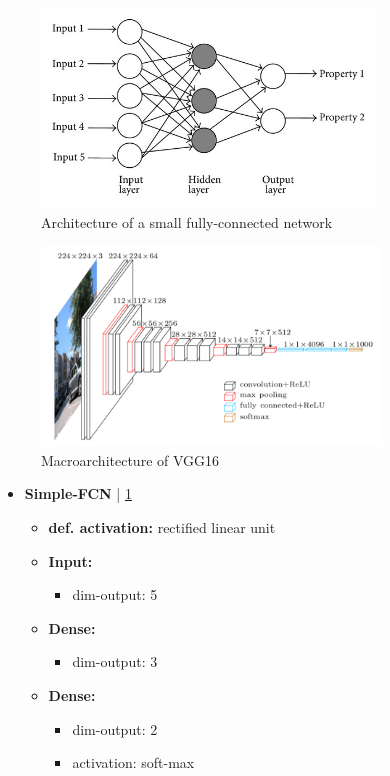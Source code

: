 \begin{figure}
	\centering
	\includegraphics[height=200px]{gfx/Dense_FFNetwork.jpg}
	\caption{Architecture of a small fully-connected network\\
		\cite{dense_network}}
	\label{fig:FFNetwork}
\end{figure}

\begin{figure}
	\centering
	\includegraphics[height=200px]{gfx/vgg16.png}
	\caption{Macroarchitecture of VGG16\\
		\cite{VGG16}}
	\label{fig:VGG16}
\end{figure}

\begin{itemize}
	\item[] \textbf{Simple-FCN} | \ref{fig:FFNetwork}
	\begin{itemize}
			\item[]\textbf{def. activation:} rectified linear unit
			\item[]\textbf{Input:} 
				\begin{itemize}
					\item[] dim-output: 5
				\end{itemize}
				\item[]\textbf{Dense:} 
				\begin{itemize}
					\item[] dim-output: 3
				\end{itemize}
				\item[]\textbf{Dense:} 
				\begin{itemize}
					\item[] dim-output: 2
					\item[] activation: soft-max
				\end{itemize}
	\end{itemize}
\end{itemize}

